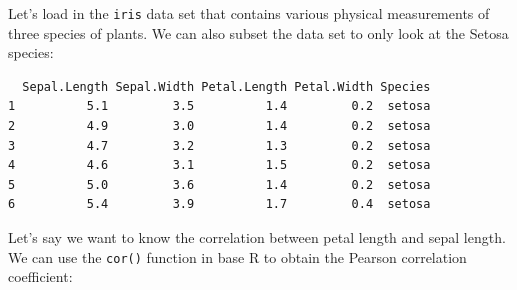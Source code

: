 \documentclass[
  letterpaper,
  DIV=11,
  numbers=noendperiod]{scrreprt}
\newenvironment{Shaded}{}{}
\newcommand{\CommentTok}[1]{\textcolor[rgb]{0.54,0.53,0.53}{#1}}
\newcommand{\FunctionTok}[1]{\textcolor[rgb]{0.39,0.29,0.61}{#1}}
\newcommand{\NormalTok}[1]{\textcolor[rgb]{0.12,0.11,0.11}{#1}}
\newcommand{\OtherTok}[1]{\textcolor[rgb]{0.00,0.43,0.16}{#1}}
\newcommand{\SpecialCharTok}[1]{\textcolor[rgb]{0.24,0.68,0.91}{#1}}
\newcommand{\StringTok}[1]{\textcolor[rgb]{0.75,0.01,0.01}{#1}}
\begin{document}
\begin{tcolorbox}[enhanced jigsaw, toptitle=1mm, titlerule=0mm, arc=.35mm, breakable, colframe=quarto-callout-note-color-frame, title={Computing Correlations in R}, opacitybacktitle=0.6, opacityback=0, colbacktitle=quarto-callout-note-color!10!white, coltitle=black, bottomtitle=1mm, colback=white, bottomrule=.15mm, rightrule=.15mm, toprule=.15mm, leftrule=.75mm, left=2mm]

Let's load in the \texttt{iris} data set that contains various physical
measurements of three species of plants. We can also subset the data set
to only look at the Setosa species:

\begin{Shaded}
\end{Shaded}

\begin{verbatim}
  Sepal.Length Sepal.Width Petal.Length Petal.Width Species
1          5.1         3.5          1.4         0.2  setosa
2          4.9         3.0          1.4         0.2  setosa
3          4.7         3.2          1.3         0.2  setosa
4          4.6         3.1          1.5         0.2  setosa
5          5.0         3.6          1.4         0.2  setosa
6          5.4         3.9          1.7         0.4  setosa
\end{verbatim}

Let's say we want to know the correlation between petal length and sepal
length. We can use the \texttt{cor()} function in base R to obtain the
Pearson correlation coefficient:

\begin{Shaded}
\end{Shaded}


\end{tcolorbox}
\end{document}
